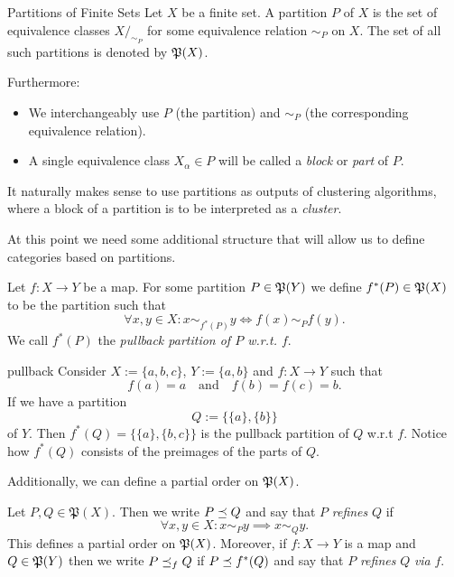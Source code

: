 \begin{definition}{Partitions of Finite Sets}{}
Let $X$ be a finite set. A partition $P$ of $X$ is the set of equivalence classes $X/_{\sim_P}$ for some equivalence relation $\sim_P$ on $X$. The set of all such partitions is denoted by $\P(X)$.\par

\medskip Furthermore:
\begin{itemize}
    \item We interchangeably use $P$ (the partition) and $\sim_P$ (the corresponding equivalence relation).
    \item A single equivalence class $X_\alpha \in P$ will be called a \emph{block} or \emph{part} of $P$.
\end{itemize}
\end{definition}

It naturally makes sense to use partitions as outputs of clustering algorithms, where a block of a partition is to be interpreted as a \emph{cluster}.

At this point we need some additional structure that will allow us to define categories based on partitions.

\begin{definition}{}{}
Let $f\colon X \to Y$ be a map. For some partition $P \in \P(Y)$ we define $f^*(P) \in \P(X)$ to be the partition such that
\begin{equation*}
    \forall x,y \in X: x \sim_{f^*(P)} y \iff f(x) \sim_P f(y).
\end{equation*}
We call $f^*(P)$ the \emph{pullback partition of $P$ w.r.t. $f$}.
\end{definition}

\begin{example}{}{pullback}
Consider $X := \{a,b,c\}$, $Y := \{a,b\}$ and $f\colon X \to Y$ such that
$$
f(a) = a \quad \text{and} \quad f(b) = f(c) = b.
$$
If we have a partition
$$
Q := \{\{a\}, \{b\}\}
$$
of $Y$. Then $f^*(Q) = \{\{a\}, \{b,c\}\}$ is the pullback partition of $Q$ w.r.t $f$. Notice how $f^*(Q)$ consists of the preimages of the parts of $Q$. 
\end{example}

Additionally, we can define a partial order on $\P(X)$.

\begin{definition}{}{}
Let $P, Q \in \mathfrak{P}(X)$. Then we write $P \refines Q$ and say that $P$ \emph{refines} $Q$ if
\begin{equation*}
    \forall x,y \in X: x \sim_P y \implies x \sim_Q y.
\end{equation*}
This defines a partial order on $\P(X)$. Moreover, if $f \colon X \to Y$ is a map and $Q \in \P(Y)$ then we write $P \refines_f Q$ if $P \refines f^*(Q)$ and say that $P$ \emph{refines} $Q$ \emph{via} $f$.
\end{definition}

